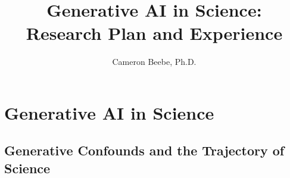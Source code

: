 \documentclass[11pt, oneside]{article}   	%
\title{Generative AI in Science: \\ Research Plan and Experience}
\author{Cameron Beebe, Ph.D.}
\begin{document}
\maketitle






\tableofcontents








\section{Generative AI in Science}




\subsection{Generative Confounds and the Trajectory of Science}

\end{document}
